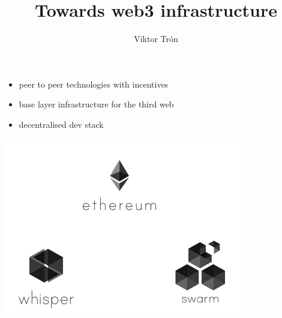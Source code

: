 \documentclass{beamer}
\title{Towards web3 infrastructure}
\author{Viktor Trón}
\begin{document}
\begin{frame}
 \titlepage
\end{frame}

\begin{frame}
\begin{block}{}
\begin{itemize}
\item peer to peer technologies with incentives
\item base layer infrastructure for the third web
\item decentralised dev stack
\end{itemize}
\end{block}
\end{frame}

\begin{frame}[plain,c]
\begin{center}
\includegraphics[width=0.8\textwidth]{ecosystem0.jpg}
\end{center}
\end{frame}

\begin{frame}
 \tableofcontents[subsectionstyle=shaded/shaded,subsubsectionstyle=hide/hide]
\end{frame}
\end{document}
